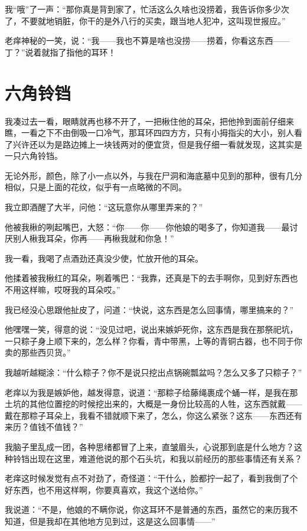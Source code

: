 我“哦”了一声：“那你真是背到家了，忙活这么久啥也没捞着，我告诉你多少次了，不要就地销脏，你干的是外八行的买卖，跟当地人犯冲，这叫现世报应。”

老痒神秘的一笑，说：“我——我也不算是啥也没捞——捞着，你看这东西——丁？”说着就指了指他的耳环！

\chapter{六角铃铛}

我凑过去一看，眼睛就再也移不开了，一把楸住他的耳朵，把他拎到面前仔细来瞧，一看之下不由倒吸一口冷气，那耳环四四方方，只有小拇指尖的大小，别人看了兴许还以为是路边摊上一块钱两对的便宜货，但是我仔细一看就发现，这其实是一只六角铃铛。

无论外形，颜色，除了小一点以外，与我在尸洞和海底墓中见到的那种，很有几分相似，只是上面的花纹，似乎有一点略微的不同。

我立即酒醒了大半，问他：“这玩意你从哪里弄来的？”

他被我楸的咧起嘴巴，大怒：“你——你——你他娘的喝多了，你知道我——最讨厌别人楸我耳朵，你再——再楸我就和你急！”

我一看，我喝了点酒劲还真没少使，忙放开他的耳朵。

他揉着被我楸红的耳朵，咧着嘴巴：“我靠，还真是下的去手啊你，见到好东西也不用这样嘛，哎呀我的耳朵哎。”

我已经没心思跟他扯皮了，问道：“快说，这东西是怎么回事情，哪里搞来的？”

他嘿嘿一笑，得意的说：“没见过吧，说出来嫉妒死你，这东西是我在那祭祀坑，一只粽子身上顺下来的，怎么样？你看，青中带黑，上等的青铜古器，也不同于你卖的那些西贝货。”

我越听越糊涂：“什么粽子？你不是说只挖出点锅碗瓢盆吗？怎么又多了只粽子？”

老痒以为我是嫉妒他，越发得意，说道：“那粽子给藤绳裹成个蛹一样，是我在那土坑的其他位置挖的时候挖出来的，大概是一身份比较高的人牲，这东西就戴——戴在那粽子耳朵上，我看不错就顺下来了，怎么，你这么紧张？这东——东西还有来历？值钱不值钱？”

我脑子里乱成一团，各种思绪都冒了上来，直皱眉头，心说那到底是什么地方？这种铃铛出现在这里，难道他说的那个石头坑，和我以前经历的那些事情还有关系？

老痒这时候发觉有点不对劲了，奇怪道：“干什么，脸都拧一起了，看到我倒了个好东西，也不用这样啊，你要真喜欢，我这个送给你。”

我说道：“不是，他娘的不瞒你说，你这耳环不是普通的东西，虽然它的来历我不知道，但是我却在其他地方见到过，这是这么回事情——”

